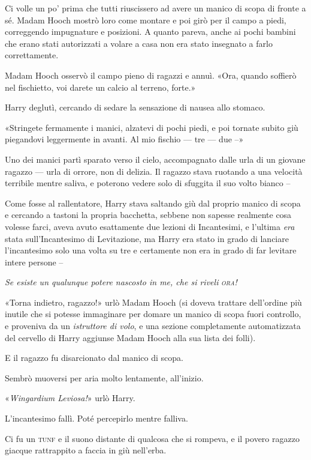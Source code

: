 Ci volle un po’ prima che tutti riuscissero ad avere un manico di scopa di fronte a sé. Madam Hooch mostrò loro come montare e poi girò per il campo a piedi, correggendo impugnature e posizioni. A quanto pareva, anche ai pochi bambini che erano stati autorizzati a volare a casa non era stato insegnato a farlo correttamente.

Madam Hooch osservò il campo pieno di ragazzi e annuì. «Ora, quando soffierò nel fischietto, voi darete un calcio al terreno, forte.»

Harry deglutì, cercando di sedare la sensazione di nausea allo stomaco.

«Stringete fermamente i manici, alzatevi di pochi piedi, e poi tornate subito giù piegandovi leggermente in avanti. Al mio fischio — tre — due –»

Uno dei manici partì sparato verso il cielo, accompagnato dalle urla di un giovane ragazzo — urla di orrore, non di delizia. Il ragazzo stava ruotando a una velocità terribile mentre saliva, e poterono vedere solo di sfuggita il suo volto bianco –

Come fosse al rallentatore, Harry stava saltando giù dal proprio manico di scopa e cercando a tastoni la propria bacchetta, sebbene non sapesse realmente cosa volesse farci, aveva avuto esattamente due lezioni di Incantesimi, e l’ultima \textit{era} stata sull’Incantesimo di Levitazione, ma Harry era stato in grado di lanciare l’incantesimo solo una volta su tre e certamente non era in grado di far levitare intere persone –

\textit{Se esiste un qualunque potere nascosto in me, che si riveli} \textsl{\textsc{ora!}}

«Torna indietro, ragazzo!» urlò Madam Hooch (si doveva trattare dell’ordine più inutile che si potesse immaginare per domare un manico di scopa fuori controllo, e proveniva da un \textit{istruttore di volo}, e una sezione completamente automatizzata del cervello di Harry aggiunse Madam Hooch alla sua lista dei folli).

E il ragazzo fu disarcionato dal manico di scopa.

Sembrò muoversi per aria molto lentamente, all’inizio.

«\textit{Wingardium Leviosa!}» urlò Harry.

L’incantesimo fallì. Poté percepirlo mentre falliva.

Ci fu un \textsc{tunf} e il suono distante di qualcosa che si rompeva, e il povero ragazzo giacque rattrappito a faccia in giù nell’erba.

